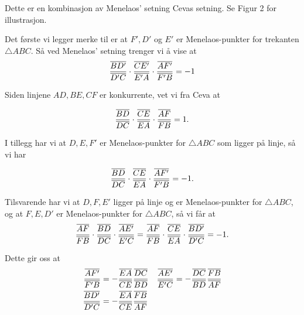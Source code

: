 \documentclass[11pt, norsk]{article}
\begin{document}
\begin{losn}
Dette er en kombinasjon av Menelaos' setning Cevas setning. Se Figur 2 for illustrasjon.

Det første vi legger merke til er at $F',D'$ og $E'$ er Menelaos-punkter for trekanten $\triangle ABC$. Så ved Menelaos' setning trenger vi å vise at
$$
\frac{\overline{BD'}}{\overline{D'C}} \cdot
\frac{\overline{CE'}}{\overline{E'A}} \cdot
\frac{\overline{AF'}}{\overline{F'B}} = -1
$$
  
Siden linjene $AD,BE,CF$ er konkurrente, vet vi fra Ceva at

$$
\frac{\overline{BD}}{\overline{DC}} \cdot
\frac{\overline{CE}}{\overline{EA}} \cdot
\frac{\overline{AF}}{\overline{FB}} = 1.
$$

I tillegg har vi at $D,E,F'$ er Menelaos-punkter for $\triangle ABC$ som ligger på linje, så vi har

$$
\frac{\overline{BD}}{\overline{DC}} \cdot
\frac{\overline{CE}}{\overline{EA}} \cdot
\frac{\overline{AF'}}{\overline{F'B}} = -1.
$$

Tilsvarende har vi at $D,F,E'$ ligger på linje og er Menelaos-punkter for $\triangle ABC$, og at $F,E,D'$ er Menelaos-punkter for $\triangle ABC$, så vi får at
$$
\frac{\overline{AF}}{\overline{FB}} \cdot
\frac{\overline{BD}}{\overline{DC}} \cdot
\frac{\overline{AE'}}{\overline{E'C}} = 
\frac{\overline{AF}}{\overline{FB}} \cdot
\frac{\overline{CE}}{\overline{EA}} \cdot
\frac{\overline{BD'}}{\overline{D'C}} = -1.
$$

Dette gir oss at
\begin{align*}
\frac{\overline{AF'}}{\overline{F'B}} &= - \frac{\overline{EA}}{\overline{CE}}\frac{\overline{DC}}{\overline{BD}} &
\frac{\overline{AE'}}{\overline{E'C}} &= - \frac{\overline{DC}}{\overline{BD}}\frac{\overline{FB}}{\overline{AF}}  \\
\frac{\overline{BD'}}{\overline{D'C}} &= - \frac{\overline{EA}}{\overline{CE}}\frac{\overline{FB}}{\overline{AF}} 
\end{align*}


\end{losn}
\end{document}

